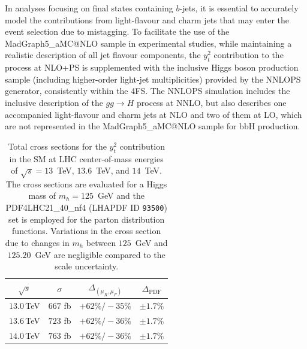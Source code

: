 \documentclass[11pt,a4paper]{article}
\begin{document}
In analyses focusing on final states containing $b$-jets, it is essential to accurately model the contributions 
from light-flavour and charm jets that may enter the event selection due to mistagging. 
To facilitate the use of the {\sc MadGraph5\_aMC@NLO} sample in experimental studies, 
while maintaining a realistic description of all jet flavour components, 
the $y_t^2$ contribution to the \bbH{} process at NLO+PS 
is supplemented with the inclusive Higgs boson production sample (including higher-order light-jet multiplicities) 
provided by the {\sc NNLOPS} generator, consistently within the 4FS.
The {\sc NNLOPS} simulation includes the inclusive description of the $gg \to H$ process at NNLO, but also describes 
one accompanied light-flavour and charm jets at NLO and two of them at LO, which are not represented in 
the {\sc MadGraph5\_aMC@NLO} sample for bbH{} production.

\begin{table}[b]
\begin{center}%
\begin{small}%
\begin{tabular}{|c|c|c|c|}%
\hline
$\sqrt{s}$ & $\sigma^{}$ & $\Delta_{\left(\mu_{R},\mu_{F}\right)}$ & $\Delta_{\mathrm{PDF}}$  \\\hline\hline
$13.0$\,TeV & $667$ fb & $+62\% / -35\%$ & $\pm 1.7\%$ \\\hline
$13.6$\,TeV  & $723$ fb & $+62\% / -36\%$ & $\pm 1.7\%$ \\\hline
$14.0$\,TeV & $763$ fb & $+62\% / -36\%$ & $\pm 1.7\%$ \\\hline
\end{tabular}%
\end{small}%
\end{center}%
\caption{Total \bbH{} cross sections for the $y_t^2$ contribution in the SM at LHC center-of-mass energies of $\sqrt{s} = 13$~TeV, $13.6$~TeV, and $14$~TeV. The cross sections are evaluated for a Higgs mass of $m_h = 125$~GeV and the PDF4LHC21\_40\_nf4 (LHAPDF ID \texttt{93500}) set is employed for the parton distribution functions. Variations in the cross section due to changes in $m_h$ between $125$~GeV and $125.20$~GeV are negligible compared to the scale uncertainty.}
\label{tab:bbHytxsec}
\end{table}
\end{document}
